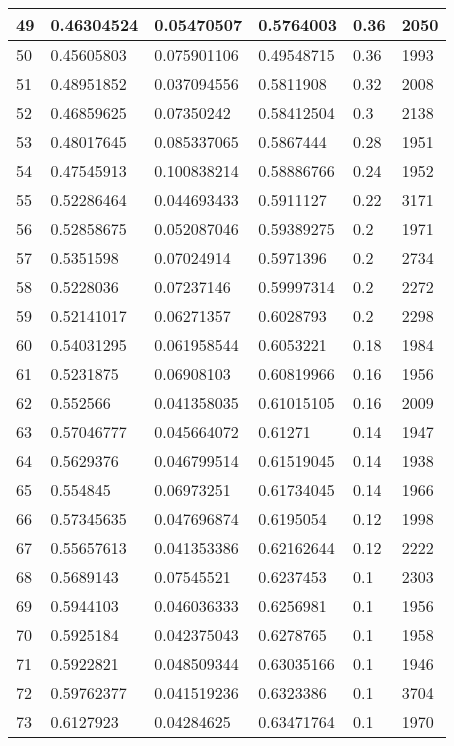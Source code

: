 \begin{longtable}{|l|l|l|l|l|l|}
49 & 0.46304524 & 0.05470507 & 0.5764003 & 0.36 & 2050 \\ \hline 
50 & 0.45605803 & 0.075901106 & 0.49548715 & 0.36 & 1993 \\ \hline 
51 & 0.48951852 & 0.037094556 & 0.5811908 & 0.32 & 2008 \\ \hline 
52 & 0.46859625 & 0.07350242 & 0.58412504 & 0.3 & 2138 \\ \hline 
53 & 0.48017645 & 0.085337065 & 0.5867444 & 0.28 & 1951 \\ \hline 
54 & 0.47545913 & 0.100838214 & 0.58886766 & 0.24 & 1952 \\ \hline 
55 & 0.52286464 & 0.044693433 & 0.5911127 & 0.22 & 3171 \\ \hline 
56 & 0.52858675 & 0.052087046 & 0.59389275 & 0.2 & 1971 \\ \hline 
57 & 0.5351598 & 0.07024914 & 0.5971396 & 0.2 & 2734 \\ \hline 
58 & 0.5228036 & 0.07237146 & 0.59997314 & 0.2 & 2272 \\ \hline 
59 & 0.52141017 & 0.06271357 & 0.6028793 & 0.2 & 2298 \\ \hline 
60 & 0.54031295 & 0.061958544 & 0.6053221 & 0.18 & 1984 \\ \hline 
61 & 0.5231875 & 0.06908103 & 0.60819966 & 0.16 & 1956 \\ \hline 
62 & 0.552566 & 0.041358035 & 0.61015105 & 0.16 & 2009 \\ \hline 
63 & 0.57046777 & 0.045664072 & 0.61271 & 0.14 & 1947 \\ \hline 
64 & 0.5629376 & 0.046799514 & 0.61519045 & 0.14 & 1938 \\ \hline 
65 & 0.554845 & 0.06973251 & 0.61734045 & 0.14 & 1966 \\ \hline 
66 & 0.57345635 & 0.047696874 & 0.6195054 & 0.12 & 1998 \\ \hline 
67 & 0.55657613 & 0.041353386 & 0.62162644 & 0.12 & 2222 \\ \hline 
68 & 0.5689143 & 0.07545521 & 0.6237453 & 0.1 & 2303 \\ \hline 
69 & 0.5944103 & 0.046036333 & 0.6256981 & 0.1 & 1956 \\ \hline 
70 & 0.5925184 & 0.042375043 & 0.6278765 & 0.1 & 1958 \\ \hline 
71 & 0.5922821 & 0.048509344 & 0.63035166 & 0.1 & 1946 \\ \hline 
72 & 0.59762377 & 0.041519236 & 0.6323386 & 0.1 & 3704 \\ \hline 
73 & 0.6127923 & 0.04284625 & 0.63471764 & 0.1 & 1970 \\ \hline 

\end{longtable}
